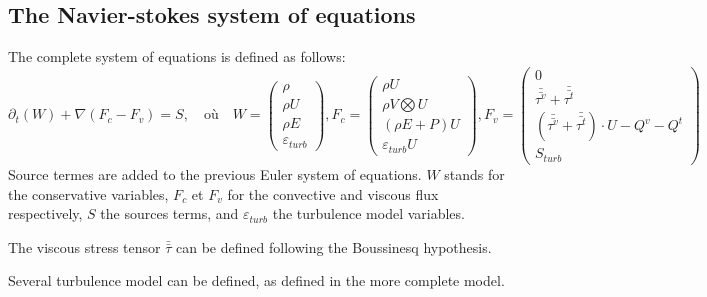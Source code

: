 \subsection{The Navier-stokes system of equations}
The complete system of equations is defined as follows:
\begin{equation}
\partial_t (W) + \nabla (F_c-F_v) = S,
\quad \mbox{où}\quad
W=\begin{pmatrix}
\rho\\
\rho U\\
\rho E\\
\varepsilon_{turb}
\end{pmatrix},
F_c=\begin{pmatrix}
\rho U\\
\rho V\bigotimes U\\
(\rho E +P)U\\
\varepsilon_{turb} U
\end{pmatrix},
F_v=\begin{pmatrix}
0\\
\bar{\bar{\tau^v}} +\bar{\bar{\tau^t}}\\
(\bar{\bar{\tau^v}} +\bar{\bar{\tau^t}})\cdot U-Q^v-Q^t\\
S_{turb}
\end{pmatrix}
\label{sistema4}
\end{equation}
Source termes are added to the previous Euler system of equations. $W$
stands for the conservative variables, $F_c$ et $F_v$ for the
convective and viscous flux respectively, $S$ the sources terms, and
$\varepsilon_{turb}$ the turbulence model variables.

The viscous stress tensor $\bar{\bar{\tau}}$ can be defined following
the Boussinesq hypothesis.

Several turbulence model can be defined, as defined in the more
complete model.
